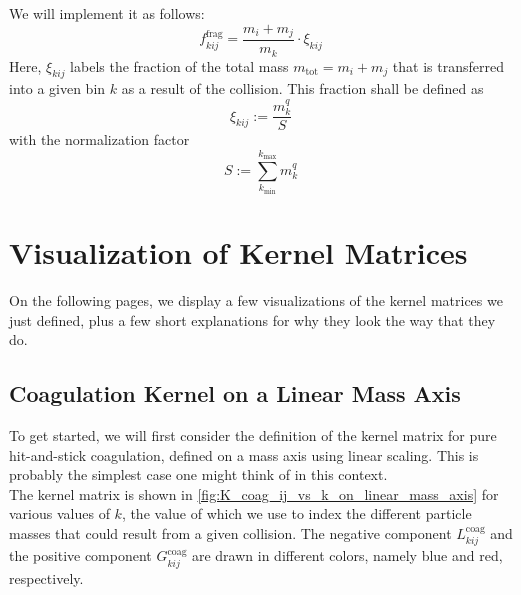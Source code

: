         We will implement it as follows:
        \begin{equation}
            f^\text{frag}_{kij} = \frac{m_i + m_j}{m_k} \cdot \xi_{kij}
        \end{equation}
        Here, $\xi_{kij}$ labels the fraction of the total mass $m_\text{tot} = m_i + m_j$ that 
        is transferred into a given bin $k$ as a result of the collision. 
        This fraction shall be defined as 
        \begin{equation}
            \xi_{kij} := \frac{m_k^q}{S}
        \end{equation}
        with the normalization factor
        \begin{equation}
            S := \sum_{k_\text{min}}^{k_\text{max}} m_k^q %
        \end{equation}



\clearpage\section{Visualization of Kernel Matrices}
    
    On the following pages, we display a few visualizations of the kernel matrices we just 
    defined, plus a few short explanations for why they look the way that they do.

    \subsection{Coagulation Kernel on a Linear Mass Axis}
    \label{sec:coagulation_kernel_on_linear_mass_axis}

        To get started, we will first consider the definition of the kernel matrix 
        for pure hit-and-stick coagulation, defined on a mass axis using linear scaling.
        This is probably the simplest case one might think of in this context. \\

        The kernel matrix is shown in \cref{fig:K_coag_ij_vs_k_on_linear_mass_axis} for 
        various values of $k$, the value of which we use to index the different particle 
        masses that could result from a given collision.
        The negative component $L^\text{coag}_{kij}$ and the positive component 
        $G^\text{coag}_{kij}$ are drawn in different colors, namely blue and red, respectively. \\

